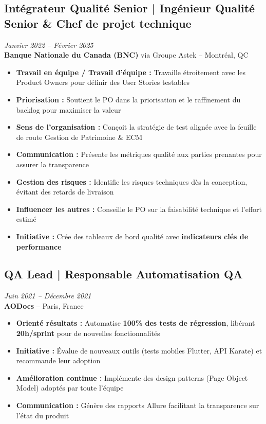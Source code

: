 \documentclass[11pt,a4paper]{article}
\newcommand{\highlight}[1]{\textcolor{primaryblue}{\textbf{#1}}}
\newcommand{\keypoint}[1]{\textbf{#1}}
\begin{document}
\subsection*{Intégrateur Qualité Senior | Ingénieur Qualité Senior \& Chef de projet technique} \hfill \textit{\color{mediumgray}Janvier 2022 -- Février 2025}\\
\textcolor{primaryblue}{\textbf{Banque Nationale du Canada (BNC)}} via Groupe Astek -- Montréal, QC
\begin{itemize}[leftmargin=22pt]
    \item \highlight{Travail en équipe / Travail d'équipe :} Travaille étroitement avec les Product Owners pour définir des User Stories testables
    \item \highlight{Priorisation :} Soutient le PO dans la priorisation et le raffinement du backlog pour maximiser la valeur
    \item \highlight{Sens de l'organisation :} Conçoit la stratégie de test alignée avec la feuille de route Gestion de Patrimoine \& ECM
    \item \highlight{Communication :} Présente les métriques qualité aux parties prenantes pour assurer la transparence
    \item \highlight{Gestion des risques :} Identifie les risques techniques dès la conception, évitant des retards de livraison
    \item \highlight{Influencer les autres :} Conseille le PO sur la faisabilité technique et l'effort estimé
    \item \highlight{Initiative :} Crée des tableaux de bord qualité avec \highlight{indicateurs clés de performance}
\end{itemize}

\subsection*{QA Lead | Responsable Automatisation QA} \hfill \textit{\color{mediumgray}Juin 2021 -- Décembre 2021}\\
\textcolor{primaryblue}{\textbf{AODocs}} -- Paris, France
\begin{itemize}[leftmargin=22pt]
    \item \highlight{Orienté résultats :} Automatise \keypoint{100\% des tests de régression}, libérant \keypoint{20h/sprint} pour de nouvelles fonctionnalités
    \item \highlight{Initiative :} Évalue de nouveaux outils (tests mobiles Flutter, API Karate) et recommande leur adoption
    \item \highlight{Amélioration continue :} Implémente des design patterns (Page Object Model) adoptés par toute l'équipe
    \item \highlight{Communication :} Génère des rapports Allure facilitant la transparence sur l'état du produit
\end{itemize}
\end{document}
